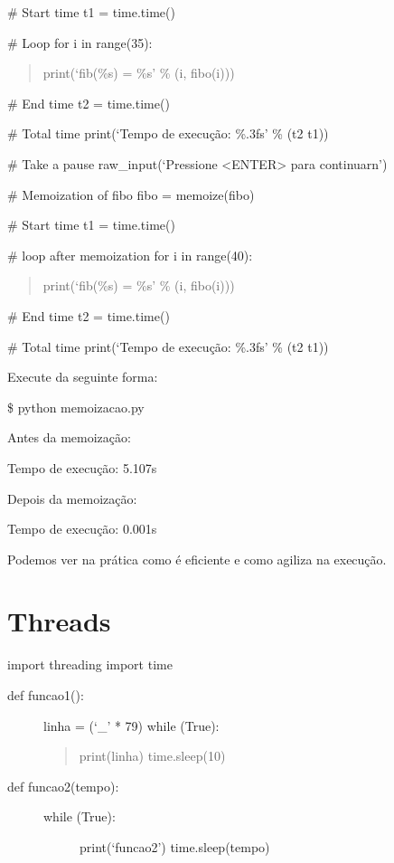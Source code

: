 \documentclass[letterpaper,10pt,brazil]{sphinxmanual}
\begin{document}
\# Start time
t1 = time.time()

\# Loop
for i in range(35):
\begin{quote}

print(‘fib(\%s) = \%s’ \% (i, fibo(i)))
\end{quote}

\# End time
t2 = time.time()

\# Total time
print(‘Tempo de execução: \%.3fs’ \% (t2 \sphinxhyphen{} t1))

\# Take a pause
raw\_input(‘Pressione \textless{}ENTER\textgreater{} para continuarn’)

\# Memoization of fibo
fibo = memoize(fibo)

\# Start time
t1 = time.time()

\# loop after memoization
for i in range(40):
\begin{quote}

print(‘fib(\%s) = \%s’ \% (i, fibo(i)))
\end{quote}

\# End time
t2 = time.time()

\# Total time
print(‘Tempo de execução: \%.3fs’ \% (t2 \sphinxhyphen{} t1))

Execute da seguinte forma:

\$ python memoizacao.py

Antes da memoização:

Tempo de execução: 5.107s

Depois da memoização:

Tempo de execução: 0.001s

Podemos ver na prática como é eficiente e como agiliza na execução.


\chapter{Threads}
\label{\detokenize{content/threads:threads}}\label{\detokenize{content/threads::doc}}
import threading
import time
\begin{description}
\item[{def funcao1():}] \leavevmode
linha = (‘\_’ * 79)
while (True):
\begin{quote}

print(linha)
time.sleep(10)
\end{quote}

\item[{def funcao2(tempo):}] \leavevmode\begin{description}
\item[{while (True):}] \leavevmode
print(‘funcao2’)
time.sleep(tempo)

\end{description}

\end{description}
\end{document}
